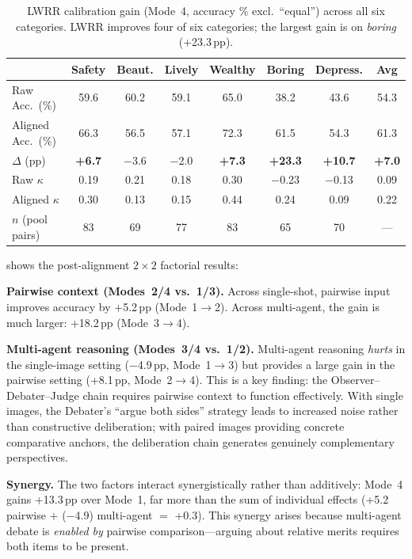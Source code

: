 \documentclass[runningheads]{llncs}
\begin{document}
\begin{table}[t]
\centering
\caption{LWRR calibration gain (Mode~4, accuracy \% excl.\ ``equal'') across all six categories. LWRR improves four of six categories; the largest gain is on \emph{boring} (+23.3\,pp).}
\label{tab:vrm_gain_main}
\small
\begin{tabular}{lcccccc|c}
\toprule
 & Safety & Beaut. & Lively & Wealthy & Boring & Depress. & Avg \\
\midrule
Raw Acc.\ (\%)     & 59.6 & 60.2 & 59.1 & 65.0 & 38.2 & 43.6 & 54.3 \\
Aligned Acc.\ (\%) & 66.3 & 56.5 & 57.1 & 72.3 & 61.5 & 54.3 & 61.3 \\
$\Delta$ (pp)      & \textbf{+6.7} & $-$3.6 & $-$2.0 & \textbf{+7.3} & \textbf{+23.3} & \textbf{+10.7} & \textbf{+7.0} \\
\midrule
Raw $\kappa$       & 0.19 & 0.21 & 0.18 & 0.30 & $-$0.23 & $-$0.13 & 0.09 \\
Aligned $\kappa$   & 0.30 & 0.13 & 0.15 & 0.44 & 0.24 & 0.09 & 0.22 \\
\midrule
$n$ (pool pairs)   & 83 & 69 & 77 & 83 & 65 & 70 & --- \\
\bottomrule
\end{tabular}
\end{table}

 shows the post-alignment $2{\times}2$ factorial results:

\smallskip\noindent\textbf{Pairwise context (Modes~2/4 vs.~1/3).}
Across single-shot, pairwise input improves accuracy by +5.2\,pp (Mode~1$\to$2).
Across multi-agent, the gain is much larger: +18.2\,pp (Mode~3$\to$4).

\smallskip\noindent\textbf{Multi-agent reasoning (Modes~3/4 vs.~1/2).}
Multi-agent reasoning \emph{hurts} in the single-image setting ($-$4.9\,pp, Mode~1$\to$3) but provides a large gain in the pairwise setting (+8.1\,pp, Mode~2$\to$4).
This is a key finding: the Observer--Debater--Judge chain requires pairwise context to function effectively.
With single images, the Debater's ``argue both sides'' strategy leads to increased noise rather than constructive deliberation; with paired images providing concrete comparative anchors, the deliberation chain generates genuinely complementary perspectives.

\smallskip\noindent\textbf{Synergy.}
The two factors interact synergistically rather than additively: Mode~4 gains +13.3\,pp over Mode~1, far more than the sum of individual effects (+5.2 pairwise $+$ ($-$4.9) multi-agent $=$ +0.3).
This synergy arises because multi-agent debate is \emph{enabled by} pairwise comparison---arguing about relative merits requires both items to be present.
\end{document}
